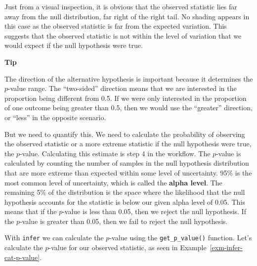 \documentclass[
  letterpaper,
  krantz1]{latex/krantz-mod}
\theoremstyle{definition}
\theoremstyle{definition}
\theoremstyle{remark}
\begin{document}
Just from a visual inspection, it is obvious that the observed statistic
lies far away from the null distribution, far right of the right tail.
No shading appears in this case as the observed statistic is far from
the expected variation. This suggests that the observed statistic is not
within the level of variation that we would expect if the null
hypothesis were true.

\begin{tcolorbox}[enhanced jigsaw, toprule=.15mm, breakable, colback=white, arc=.35mm, left=2mm, colframe=quarto-callout-color-frame, opacityback=0, bottomrule=.15mm, rightrule=.15mm, leftrule=.75mm]

\textbf{ Tip}

The direction of the alternative hypothesis is important because it
determines the \(p\)-value range. The ``two-sided'' direction means that
we are interested in the proportion being different from 0.5. If we were
only interested in the proportion of one outcome being greater than 0.5,
then we would use the ``greater'' direction, or ``less'' in the opposite
scenario.

\end{tcolorbox}

But we need to quantify this. We need to calculate the probability of
observing the observed statistic or a more extreme statistic if the null
hypothesis were true, the \(p\)-value. Calculating this
estimate is step 4 in the workflow. The \(p\)-value is calculated by
counting the number of samples in the null hypothesis distribution that
are more extreme than expected within some level of uncertainty. 95\% is
the most common level of uncertainty, which is called the \textbf{alpha
level}. The remaining 5\% of the distribution is the
space where the likelihood that the null hypothesis accounts for the
statistic is below our given alpha level of 0.05. This means that if the
\(p\)-value is less than 0.05, then we reject the null hypothesis. If
the \(p\)-value is greater than 0.05, then we fail to reject the null
hypothesis.

With \texttt{infer} we can calculate the \(p\)-value using the
\texttt{get\_p\_value()} function. Let's calculate the \(p\)-value for
our observed statistic, as seen in Example~\ref{exm-infer-cat-p-value}.

\pagebreak
\end{document}
